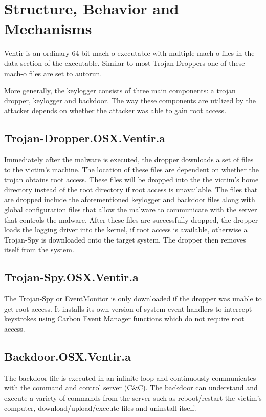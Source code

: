 \documentclass[conference]{IEEEtran}
\begin{document}
\section{Structure, Behavior and Mechanisms}
Ventir is an ordinary 64-bit mach-o executable with multiple mach-o files in the
data section of the executable. Similar to most Trojan-Droppers one of these
mach-o files are set to autorun\cite{erwin_ventir_2014}.

More generally, the keylogger consists of three main components: a trojan
dropper, keylogger and backdoor. The way these components are utilized by the
attacker depends on whether the attacker was able to gain root
access\cite{kuzin_ventir_2014}.

\subsection{Trojan-Dropper.OSX.Ventir.a}
Immediately after the malware is executed, the dropper downloads a set of files
to the victim's machine. The location of these files are dependent on whether
the trojan obtains root access. These files will be dropped into the the
victim's home directory instead of the root directory if root access is
unavailable\cite{kuzin_ventir_2014}. The files that are dropped include the
aforementioned keylogger and backdoor files along with global configuration
files that allow the malware to communicate with the server that controls the
malware. After these files are successfully dropped, the dropper loads the
logging driver into the kernel, if root access is available, otherwise a
Trojan-Spy is downloaded onto the target system. The dropper then removes itself
from the system\cite{erwin_ventir_2014}.

\subsection{Trojan-Spy.OSX.Ventir.a}
The Trojan-Spy or EventMonitor is only downloaded if the dropper was unable to
get root access. It installs its own version of system event handlers to
intercept keystrokes using Carbon Event Manager functions which do not require
root access\cite{kuzin_ventir_2014}.

\subsection{Backdoor.OSX.Ventir.a}
The backdoor file is executed in an infinite loop and continuously communicates
with the command and control server (C\&C). The backdoor can understand and
execute a variety of commands from the server such as reboot/restart the
victim's computer, download/upload/execute files and uninstall itself.
\end{document}
